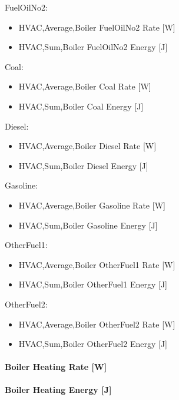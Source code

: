 FuelOilNo2:

\begin{itemize}
\item
  HVAC,Average,Boiler FuelOilNo2 Rate {[}W{]}
\item
  HVAC,Sum,Boiler FuelOilNo2 Energy {[}J{]}
\end{itemize}

Coal:

\begin{itemize}
\item
  HVAC,Average,Boiler Coal Rate {[}W{]}
\item
  HVAC,Sum,Boiler Coal Energy {[}J{]}
\end{itemize}

Diesel:

\begin{itemize}
\item
  HVAC,Average,Boiler Diesel Rate {[}W{]}
\item
  HVAC,Sum,Boiler Diesel Energy {[}J{]}
\end{itemize}

Gasoline:

\begin{itemize}
\item
  HVAC,Average,Boiler Gasoline Rate {[}W{]}
\item
  HVAC,Sum,Boiler Gasoline Energy {[}J{]}
\end{itemize}

OtherFuel1:

\begin{itemize}
\item
  HVAC,Average,Boiler OtherFuel1 Rate {[}W{]}
\item
  HVAC,Sum,Boiler OtherFuel1 Energy {[}J{]}
\end{itemize}

OtherFuel2:

\begin{itemize}
\item
  HVAC,Average,Boiler OtherFuel2 Rate {[}W{]}
\item
  HVAC,Sum,Boiler OtherFuel2 Energy {[}J{]}
\end{itemize}

\paragraph{Boiler Heating Rate {[}W{]}}\label{boiler-heating-rate-w-1}

\paragraph{Boiler Heating Energy {[}J{]}}\label{boiler-heating-energy-j-1}

